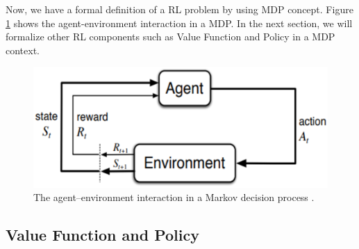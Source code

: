Now, we have a formal definition of a RL problem by using MDP concept. Figure \ref{fig:mdprlsystem} shows the agent-environment interaction in a MDP. In the next section, we will formalize other RL components such as Value Function and Policy in a MDP context.

\begin{figure}[ht!]
	\centering
	\includegraphics[scale=0.5]{Cap4/mdprlsystem.eps}
	\caption{The agent–environment interaction in a Markov decision process \cite{sutton1998rli}.}
	\label{fig:mdprlsystem}
\end{figure}

\subsection{Value Function and Policy}

